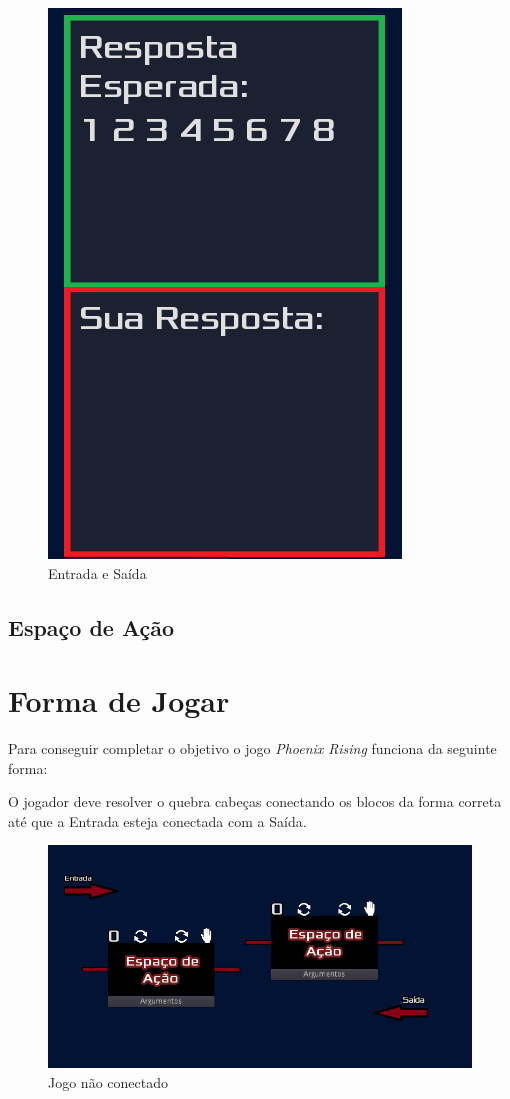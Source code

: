\begin{figure}[H]
\begin{minipage}{.4\textwidth}
      \includegraphics[scale=0.3]{../figuras/exemplo_saida.png}
    \end{minipage}
    \caption{Entrada e Saída}
\end{figure}

\subsection{Espaço de Ação}

\section{Forma de Jogar}
\label{sec:consideracoes_preliminares}

Para conseguir completar o objetivo o jogo \textit{Phoenix Rising} funciona
da seguinte forma:

O jogador deve resolver o quebra cabeças conectando os blocos da forma correta
até que a Entrada esteja conectada com a Saída.

\begin{figure}[H]
    \includegraphics[width=\textwidth]{../figuras/jogo_nao_conectado.png}
    \caption{Jogo não conectado}
\end{figure}

